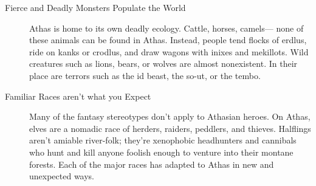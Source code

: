 \begin{description}
    \item [Fierce and Deadly Monsters Populate the World] Athas is home to its own deadly ecology. Cattle,
        horses, camels— none of these animals can be found in Athas. Instead, people tend flocks of erdlus,
        ride on kanks or crodlus, and draw wagons with inixes and mekillots. Wild creatures such as lions,
        bears, or wolves are almost nonexistent. In their place are terrors such as the id beast, the
        so-ut, or the tembo.

    \item [Familiar Races aren't what you Expect] Many of the fantasy stereotypes don’t apply to Athasian
        heroes. On Athas, elves are a nomadic race of herders, raiders, peddlers, and thieves. Halflings
        aren't amiable river-folk; they're xenophobic headhunters and cannibals who hunt and kill anyone
        foolish enough to venture into their montane forests. Each of the major races has adapted to Athas
        in new and unexpected ways.
\end{description}
